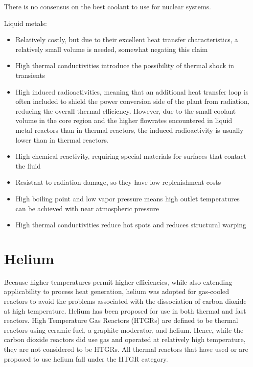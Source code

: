 \documentclass[10pt]{article}
\numberwithin{equation}{section} %
\begin{document}
There is no consensus on the best coolant to use for nuclear systems. 

Liquid metals: 

\begin{itemize}
\item Relatively costly, but due to their excellent heat transfer characteristics, a relatively small volume is needed, somewhat negating this claim
\item High thermal conductivities introduce the possibility of thermal shock in transients
\item High induced radioactivities, meaning that an additional heat transfer loop is often included to shield the power conversion side of the plant from radiation, reducing the overall thermal efficiency. However, due to the small coolant volume in the core region and the higher flowrates encountered in liquid metal reactors than in thermal reactors, the induced radioactivity is usually lower than in thermal reactors. 
\item High chemical reactivity, requiring special materials for surfaces that contact the fluid
\end{itemize}

\begin{itemize}
\item Resistant to radiation damage, so they have low replenishment costs
\item High boiling point and low vapor pressure means high outlet temperatures can be achieved with near atmospheric pressure
\item High thermal conductivities reduce hot spots and reduces structural warping
\end{itemize}

\section{Helium}

Because higher temperatures permit higher efficiencies, while also extending applicability to process heat generation, helium was adopted for gas-cooled reactors to avoid the problems associated with the dissociation of carbon dioxide at high temperature. Helium has been proposed for use in both thermal and fast reactors. High Temperature Gas Reactors (HTGRs) are defined to be thermal reactors using ceramic fuel, a graphite moderator, and helium. Hence, while the carbon dioxide reactors did use gas and operated at relatively high temperature, they are not considered to be HTGRs. All thermal reactors that have used or are proposed to use helium fall under the HTGR category. 
\end{document}
